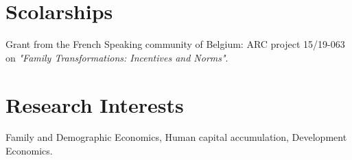 \documentclass[10pt]{article} %
\begin{document}

\section{Scolarships}
Grant from the French Speaking community of Belgium: ARC project 15/19-063 on \textit{"Family Transformations: Incentives and Norms"}.

\section{Research Interests}
Family and Demographic Economics, Human capital accumulation, Development Economics.





\end{document}
